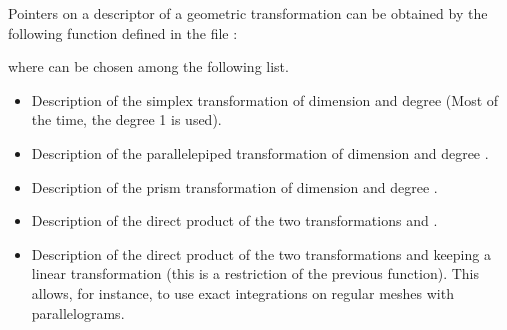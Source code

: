 \documentclass[a4paper,11pt,english]{sphinxmanual}
\begin{document}
Pointers on a descriptor of a geometric transformation can be obtained by the
following function defined in the file :

\begin{sphinxVerbatim}[commandchars=\\\{\}]
   
\end{sphinxVerbatim}

where  can be chosen among the following list.
\begin{itemize}
\item {} 

Description of the simplex transformation of dimension  and degree 
(Most of the time, the degree 1 is used).

\item {} 

Description of the parallelepiped transformation of dimension  and degree
.

\item {} 

Description of the prism transformation of dimension  and degree .

\item {} 

Description of the direct product of the two transformations  and .

\item {} 

Description of the direct product of the two transformations  and 
keeping a linear transformation (this is a restriction of the previous
function). This allows, for instance, to use exact integrations on regular
meshes with parallelograms.

\end{itemize}
\end{document}
